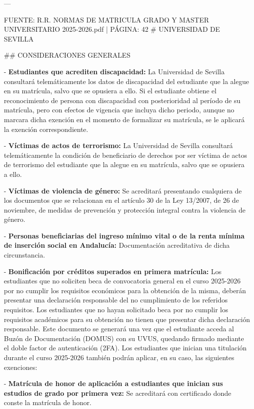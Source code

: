 \documentclass{article}
\begin{document}
\begin{itemize}
\begin{itemize}
\begin{scriptsize}
                  ---

                  FUENTE: R.R. NORMAS DE MATRICULA GRADO Y MASTER UNIVERSITARIO 2025-2026.pdf | PÁGINA: 42
                  \# UNIVERSIDAD DE SEVILLA

                  \#\# CONSIDERACIONES GENERALES

                  - \textbf{Estudiantes que acrediten discapacidad:} La Universidad de Sevilla consultará telemáticamente los datos de discapacidad del estudiante que la alegue en su matrícula, salvo que se opusiera a ello. Si el estudiante obtiene el reconocimiento de persona con discapacidad con posterioridad al período de su matrícula, pero con efectos de vigencia que incluya dicho periodo, aunque no marcara dicha exención en el momento de formalizar su matrícula, se le aplicará la exención correspondiente.

                  - \textbf{Víctimas de actos de terrorismo:} La Universidad de Sevilla consultará telemáticamente la condición de beneficiario de derechos por ser víctima de actos de terrorismo del estudiante que la alegue en su matrícula, salvo que se opusiera a ello.

                  - \textbf{Víctimas de violencia de género:} Se acreditará presentando cualquiera de los documentos que se relacionan en el artículo 30 de la Ley 13/2007, de 26 de noviembre, de medidas de prevención y protección integral contra la violencia de género.

                  - \textbf{Personas beneficiarias del ingreso mínimo vital o de la renta mínima de inserción social en Andalucía:} Documentación acreditativa de dicha circunstancia.

                  - \textbf{Bonificación por créditos superados en primera matrícula:} Los estudiantes que no soliciten beca de convocatoria general en el curso 2025-2026 por no cumplir los requisitos económicos para la obtención de la misma, deberán presentar una declaración responsable del no cumplimiento de los referidos requisitos. Los estudiantes que no hayan solicitado beca por no cumplir los requisitos académicos para su obtención no tienen que presentar dicha declaración responsable. Este documento se generará una vez que el estudiante acceda al Buzón de Documentación (DOMUS) con su UVUS, quedando firmado mediante el doble factor de autenticación (2FA). Los estudiantes que inician una titulación durante el curso 2025-2026 también podrán aplicar, en su caso, las siguientes exenciones:

                  - \textbf{Matrícula de honor de aplicación a estudiantes que inician sus estudios de grado por primera vez:} Se acreditará con certificado donde conste la matrícula de honor.


\end{scriptsize}
\end{itemize}
\end{itemize}
\end{document}
